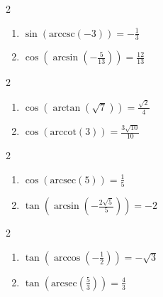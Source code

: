 \documentclass{ximera}
\begin{document}
\begin{multicols}{2}

\begin{enumerate}

\setcounter{enumi}{\value{HW}}

\item  $\sin\left(\text{arccsc}\left(-3\right)\right) = -\frac{1}{3}$ 
\item  $\cos\left(\arcsin\left(-\frac{5}{13}\right)\right) = \frac{12}{13}$

\setcounter{HW}{\value{enumi}}

\end{enumerate}

\end{multicols}

\begin{multicols}{2}

\begin{enumerate}

\setcounter{enumi}{\value{HW}}

\item  $\cos\left(\arctan\left(\sqrt{7} \right)\right) = \frac{\sqrt{2}}{4}$
\item  $\cos\left(\text{arccot}\left( 3 \right)\right) = \frac{3\sqrt{10}}{10}$

\setcounter{HW}{\value{enumi}}

\end{enumerate}

\end{multicols}

\begin{multicols}{2}

\begin{enumerate}

\setcounter{enumi}{\value{HW}}

\item  $\cos\left(\text{arcsec}\left( 5 \right)\right) = \frac{1}{5}$ 
\item  $\tan\left(\arcsin\left(-\frac{2\sqrt{5}}{5}\right)\right)=-2$

\setcounter{HW}{\value{enumi}}

\end{enumerate}

\end{multicols}

\begin{multicols}{2}

\begin{enumerate}

\setcounter{enumi}{\value{HW}}

\item  $\tan\left(\arccos\left(-\frac{1}{2}\right)\right) = -\sqrt{3}$
\item  $\tan\left(\text{arcsec}\left(\frac{5}{3}\right)\right) = \frac{4}{3}$

\setcounter{HW}{\value{enumi}}

\end{enumerate}

\end{multicols}
\end{document}

